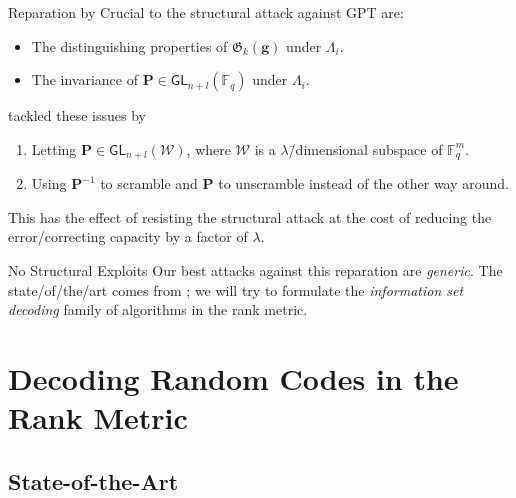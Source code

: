 \documentclass[usepdftitle=false]{beamer}
\renewcommand*{\vec}{\symbf}
\newcommand*{\mat}{\symbf}
\newcommand*{\GL}{\ensuremath{\mathsf{GL}}}
\newcommand*{\FF}{\ensuremath{\mathbb{F}}}
\newcommand*{\Gab}{\ensuremath{\mathfrak{G}}}
\begin{document}
\begin{frame}{Reparation by \textcite{Loi17}}
  Crucial to the structural attack against GPT are:
  \begin{itemize}
  \item The distinguishing properties of \(\Gab_k(\vec{g})\) under
    \(\Lambda_i\).
  \item The invariance of \(\mat{P} \in \GL_{n + l}(\FF_q)\) under
    \(\Lambda_i\).
  \end{itemize}
  \Textcite{Loi17} tackled these issues by
  \begin{enumerate}
  \item Letting \(\mat{P} \in \GL_{n + l}(\mathcal{W})\), where
    \(\mathcal{W}\) is a \(\lambda\)\=/dimensional subspace of
    \(\FF_q^m\).
  \item Using \(\mat{P}^{-1}\) to scramble and \(\mat{P}\) to
    unscramble instead of the other way around.
  \end{enumerate}
  This has the effect of \alert{resisting the structural attack} at
  the cost of reducing the error\-/correcting capacity by a factor of
  \(\lambda\).
  \begin{alertblock}{No Structural Exploits}
    Our best attacks against this reparation are \emph{generic}.  The
    state\-/of\-/the\-/art comes from \textcite{GRS13}; we will try to
    formulate the \emph{information set decoding} family of algorithms
    in the rank metric.
  \end{alertblock}
\end{frame}

\section{Decoding Random Codes in the Rank Metric}

\subsection{State-of-the-Art}
\end{document}
